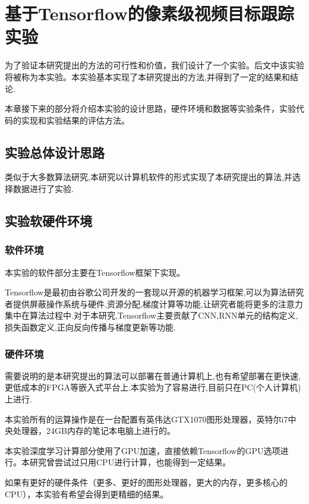 
\chapter{基于Tensorflow的像素级视频目标跟踪实验}
为了验证本研究提出的方法的可行性和价值，我们设计了一个实验。后文中该实验将被称为本实验。本实验基本实现了本研究提出的方法,并得到了一定的结果和结论.
\par
本章接下来的部分将介绍本实验的设计思路，硬件环境和数据等实验条件，实验代码的实现和实验结果的评估方法。

\section{实验总体设计思路}
类似于大多数算法研究,本研究以计算机软件的形式实现了本研究提出的算法,并选择数据进行了实验.

\section{实验软硬件环境}
\subsection{软件环境}
本实验的软件部分主要在Tensorflow\supercite{abadi2016tensorflow}框架下实现。
\par
Tensorflow是最初由谷歌公司开发的一套现以开源的机器学习框架,可以为算法研究者提供屏蔽操作系统与硬件,资源分配,梯度计算等功能,让研究者能将更多的注意力集中在算法过程中.对于本研究,Tensorflow主要贡献了CNN,RNN单元的结构定义,损失函数定义,正向反向传播与梯度更新等功能.

\subsection{硬件环境}
\par
需要说明的是本研究提出的算法可以部署在普通计算机上,也有希望部署在更快速,更低成本的FPGA等嵌入式平台上.本实验为了容易进行,目前只在PC(个人计算机)上进行.
\par
本实验所有的运算操作是在一台配置有英伟达GTX1070图形处理器，英特尔i7中央处理器，24GB内存的笔记本电脑上进行的。
\par
本实验深度学习计算部分使用了GPU加速，直接依赖Tensorflow的GPU选项进行。本研究曾尝试过只用CPU进行计算，也能得到一定结果。
\par
如果有更好的硬件条件（更多、更好的图形处理器，更大的内存，更多核心的CPU），本实验有希望会得到更精细的结果。

